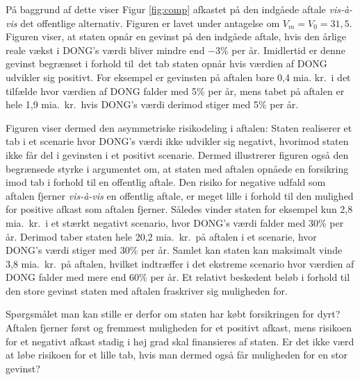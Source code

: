 \documentclass{article}
\begin{document}
På baggrund af dette viser Figur \ref{fig:comp} afkastet på den indgåede aftale \emph{vis-\`{a}-vis} det offentlige alternativ. Figuren er lavet under antagelse om  $V_m=V_0=31{,}5$. Figuren viser, at staten opnår en gevinst på den indgåede aftale, hvis den årlige reale vækst i DONG's værdi bliver mindre end $-3$\% per år. Imidlertid er denne gevinst begrænset i forhold til\ det tab staten opnår hvis værdien af DONG udvikler sig positivt. For eksempel er gevinsten på aftalen bare 0,4 mia. kr.\ i det tilfælde hvor værdien af DONG falder med 5\% per år, mens tabet på aftalen er hele 1,9 mia.\ kr.\ hvis DONG's værdi derimod stiger med 5\% per år.

Figuren viser dermed den asymmetriske risikodeling i aftalen: Staten realiserer et tab i et scenarie hvor DONG's værdi ikke udvikler sig negativt, hvorimod staten ikke får del i gevinsten i et positivt scenarie. Dermed illustrerer figuren også den begrænsede styrke i argumentet om, at staten med aftalen opnåede en forsikring imod tab i forhold til en offentlig aftale. Den risiko for negative udfald som aftalen fjerner \emph{vis-\`{a}-vis} en offentlig aftale, er meget lille i forhold til den mulighed for positive afkast som aftalen fjerner. Således vinder staten for eksempel kun 2,8 mia.\ kr.\ i et stærkt negativt scenario, hvor DONG's værdi falder med 30\% per år. Derimod taber staten hele 20,2 mia.\ kr.\ på aftalen i et scenarie, hvor DONG's værdi stiger med 30\% per år. Samlet kan staten kan maksimalt vinde 3,8 mia.\ kr.\ på aftalen, hvilket indtræffer i det ekstreme scenario hvor værdien af DONG falder med mere end 60\% per år. Et relativt beskedent beløb i forhold til den store gevinst staten med aftalen fraskriver sig muligheden for.

Spørgsmålet man kan stille er derfor om staten har købt forsikringen for dyrt? Aftalen fjerner først og fremmest muligheden for et positivt afkast, mens risikoen for et negativt afkast stadig i høj grad skal finansieres af staten. Er det ikke værd at løbe risikoen for et lille tab, hvis man dermed også får muligheden for en stor gevinst?
\end{document}
